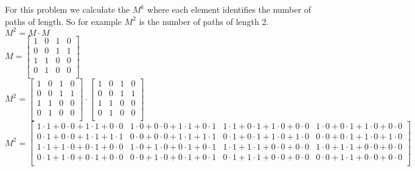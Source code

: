 For this problem we calculate the $M^k$ where each element identifies the number of paths of length.
So for example $M^2$ is the number of paths of length 2. \\
$M^2 = M \cdot M$ \\
$M = \begin{bmatrix}
    1 & 0 & 1 & 0 \\
    0 & 0 & 1 & 1 \\
    1 & 1 & 0 & 0 \\
    0 & 1 & 0 & 0 \\
\end{bmatrix}$ \\ 

$M^2 = \begin{bmatrix}
    1 & 0 & 1 & 0 \\
    0 & 0 & 1 & 1 \\
    1 & 1 & 0 & 0 \\
    0 & 1 & 0 & 0 \\
\end{bmatrix} \cdot \begin{bmatrix}
    1 & 0 & 1 & 0 \\
    0 & 0 & 1 & 1 \\
    1 & 1 & 0 & 0 \\
    0 & 1 & 0 & 0 \\
\end{bmatrix}$ \\

$M^2 = \begin{bmatrix}
    1 \cdot 1 + 0 \cdot 0 + 1 \cdot 1 + 0 \cdot 0 & 1 \cdot 0 + 0 \cdot 0 + 1 \cdot 1 + 0 \cdot 1 & 1 \cdot 1 + 0 \cdot 1 + 1 \cdot 0 + 0 \cdot 0 & 1 \cdot 0 + 0 \cdot 1 + 1 \cdot 0 + 0 \cdot 0 \\
    0 \cdot 1 + 0 \cdot 0 + 1 \cdot 1 + 1 \cdot 1 & 0 \cdot 0 + 0 \cdot 0 + 1 \cdot 1 + 1 \cdot 1 & 0 \cdot 1 + 0 \cdot 1 + 1 \cdot 0 + 1 \cdot 0 & 0 \cdot 0 + 0 \cdot 1 + 1 \cdot 0 + 1 \cdot 0 \\
    1 \cdot 1 + 1 \cdot 0 + 0 \cdot 1 + 0 \cdot 0 & 1 \cdot 0 + 1 \cdot 0 + 0 \cdot 1 + 0 \cdot 1 & 1 \cdot 1 + 1 \cdot 1 + 0 \cdot 0 + 0 \cdot 0 & 1 \cdot 0 + 1 \cdot 1 + 0 \cdot 0 + 0 \cdot 0 \\
    0 \cdot 1 + 1 \cdot 0 + 0 \cdot 1 + 0 \cdot 0 & 0 \cdot 0 + 1 \cdot 0 + 0 \cdot 1 + 0 \cdot 1 & 0 \cdot 1 + 1 \cdot 1 + 0 \cdot 0 + 0 \cdot 0 & 0 \cdot 0 + 1 \cdot 1 + 0 \cdot 0 + 0 \cdot 0 \\
\end{bmatrix}$ \\

